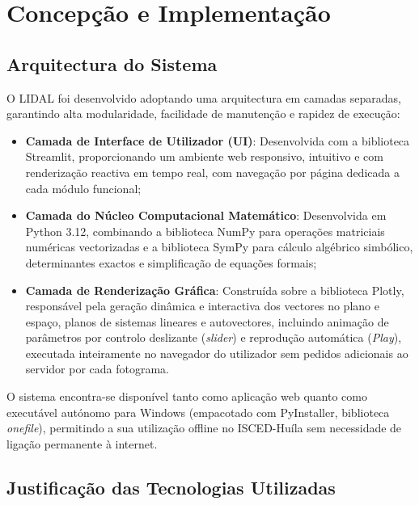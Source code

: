 \documentclass[conference]{IEEEtran}
\begin{document}
\section{Concepção e Implementação}

\subsection{Arquitectura do Sistema}

O LIDAL foi desenvolvido adoptando uma arquitectura em camadas separadas, garantindo alta modularidade, facilidade de manutenção e rapidez de execução:

\begin{itemize}
  \item \textbf{Camada de Interface de Utilizador (UI)}: Desenvolvida com a biblioteca Streamlit, proporcionando um ambiente web responsivo, intuitivo e com renderização reactiva em tempo real, com navegação por página dedicada a cada módulo funcional;
  \item \textbf{Camada do Núcleo Computacional Matemático}: Desenvolvida em Python 3.12, combinando a biblioteca NumPy para operações matriciais numéricas vectorizadas e a biblioteca SymPy para cálculo algébrico simbólico, determinantes exactos e simplificação de equações formais;
  \item \textbf{Camada de Renderização Gráfica}: Construída sobre a biblioteca Plotly, responsável pela geração dinâmica e interactiva dos vectores no plano e espaço, planos de sistemas lineares e autovectores, incluindo animação de parâmetros por controlo deslizante (\textit{slider}) e reprodução automática (\textit{Play}), executada inteiramente no navegador do utilizador sem pedidos adicionais ao servidor por cada fotograma.
\end{itemize}

O sistema encontra-se disponível tanto como aplicação web quanto como executável autónomo para Windows (empacotado com PyInstaller, biblioteca \textit{onefile}), permitindo a sua utilização offline no ISCED-Huíla sem necessidade de ligação permanente à internet.

\subsection{Justificação das Tecnologias Utilizadas}
\end{document}
